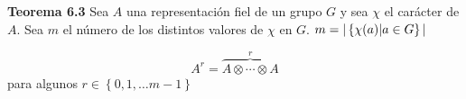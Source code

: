 \documentclass[12pt]{book}
\theoremstyle{definition}
\newcounter{in}
\begin{document}
\textbf{Teorema 6.3} Sea $A$ una representación fiel de un grupo $G$ y
sea $\chi$ el carácter de $A$. Sea $m$ el número de los distintos
valores de $\chi$ en $G$.
$m = \arrowvert \left\{ \chi(a) \arrowvert a \in G \right\}
\arrowvert$

\begin{equation*}
  A^{r}=  \overbrace{A \otimes \cdots \otimes A}^{r}
\end{equation*}
para algunos $r \in \left\{ 0, 1, \ldots m-1 \right\}$





\printindex
\end{document}
